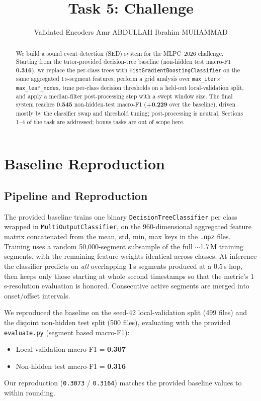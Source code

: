 \documentclass{article}
\title{Task 5: Challenge}
\author{%
   Validated Encoders \AND
  Amr ABDULLAH
  \And
  Ibrahim MUHAMMAD
}
\begin{document}
\maketitle

\begin{abstract}
We build a sound event detection (SED) system for the MLPC~2026 challenge.
Starting from the tutor-provided decision-tree baseline (non-hidden test
macro-F1 \textbf{0.316}), we replace the per-class trees with
\texttt{HistGradientBoostingClassifier} on the same aggregated
1\,s-segment features, perform a grid analysis over
\texttt{max\_iter}$\times$\texttt{max\_leaf\_nodes}, tune per-class
decision thresholds on a held-out local-validation split, and apply a
median-filter post-processing step with a swept window size. The final
system reaches \textbf{0.545} non-hidden-test macro-F1 (\textbf{+0.229}
over the baseline), driven mostly by the classifier swap and threshold
tuning; post-processing is neutral. Sections 1--4 of the task are
addressed; bonus tasks are out of scope here.
\end{abstract}

\section{Baseline Reproduction}
\label{sec:baseline}

\subsection{Pipeline and Reproduction}
The provided baseline trains
one binary \texttt{DecisionTreeClassifier} per class wrapped in
\texttt{MultiOutputClassifier}, on the 960-dimensional aggregated feature
matrix concatenated from the {mean, std, min, max} keys in the
\texttt{.npz} files. Training uses a random 50{,}000-segment subsample of
the full $\sim$1.7\,M training segments, with the remaining feature
weights identical across classes. At inference the classifier predicts on
\emph{all} overlapping 1\,s segments produced at a 0.5\,s hop, then keeps
only those starting at whole second timestamps so that the metric's
1\,s-resolution evaluation is honored. Consecutive active segments are
merged into onset/offset intervals.

We reproduced the baseline on the seed-42 local-validation split (499
files) and the disjoint non-hidden test split (500 files), evaluating
with the provided \texttt{evaluate.py} (segment based macro-F1):
\begin{itemize}\setlength\itemsep{0pt}
  \item Local validation macro-F1 = \textbf{0.307}
  \item Non-hidden test macro-F1 = \textbf{0.316}
\end{itemize}
Our reproduction (\texttt{0.3073} / \texttt{0.3164}) matches the
provided baseline values to within rounding.
\end{document}
